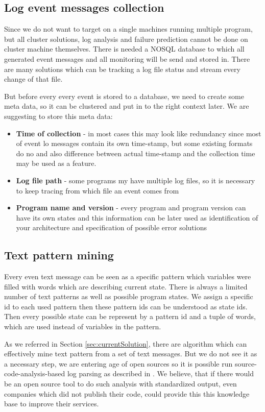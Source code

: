 \subsection{Log event messages collection}
Since we do not want to target on a single machines running multiple program, but all cluster solutions, log analysis and failure prediction cannot be done on cluster machine themselves. There is needed a NOSQL database to which all generated event messages and all monitoring will be send and stored in. There are many solutions which can be tracking a log file status and stream every change of that file.

But before every every event is stored to a database, we need to create some meta data, so it can be clustered and put in to the right context later. We are suggesting to store this meta data:
\begin{itemize}
\item \textbf{Time of collection} - in most cases this may look like redundancy since most of event lo messages contain its own time-stamp, but some existing formats do no and also difference between actual time-stamp and the collection time may be used as a feature.
\item \textbf{Log file path} - some programs my have multiple log files, so it is necessary to keep tracing from which file an event comes from
\item \textbf{Program name and version} - every program and program version can have its own states and this information can be later used as identification of your architecture and specification of possible error solutions 
\end{itemize}

\subsection{Text pattern mining}
Every even text message can be seen as a specific pattern which variables were filled with words which are describing current state. There is always a limited number of text patterns as well as possible program states. We assign a specific id to each used pattern then these pattern ids can be understood as state ids. Then every possible state can be represent by a pattern id and a tuple of words, which are used instead of variables in the pattern.

As we referred in Section \ref{sec:currentSolution}, there are algorithm which can effectively mine text pattern from a set of text messages. But we do not see it as a necessary step, we are entering age of open sources \cite{deshpande2008total} so it is possible run source-code-analysis-based log parsing as described in \cite{xu2010detecting}. We believe, that if there would be an open source tool to do such analysis with standardized output, even companies which did not publish their code, could provide this this knowledge base to improve their services.